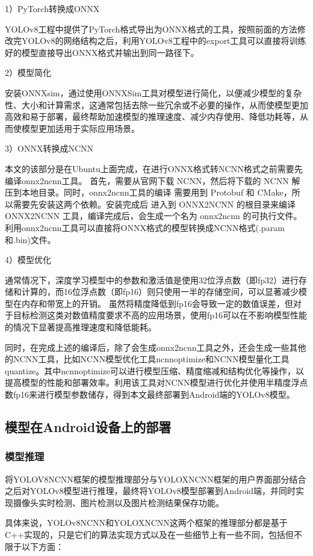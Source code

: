 \documentclass{ctexart}
\numberwithin{equation}{section}%
\numberwithin{figure}{section}%
\numberwithin{table}{section}%
\begin{document}
	1）PyTorch转换成ONNX
	
	YOLOv8工程中提供了PyTorch格式导出为ONNX格式的工具，按照前面的方法修改完YOLOv8的网络结构之后，利用YOLOv8工程中的export工具可以直接将训练好的模型直接导出ONNX格式并输出到同一路径下。
	
	2）模型简化
	
	安装ONNXsim，通过使用ONNXSim工具对模型进行简化，以便减少模型的复杂性、大小和计算需求，这通常包括去除一些冗余或不必要的操作，从而使模型更加高效和易于部署，最终帮助加速模型的推理速度、减少内存使用、降低功耗等，从而使模型更加适用于实际应用场景。
	
	3）ONNX转换成NCNN
	
	本文的该部分是在Ubuntu上面完成，在进行ONNX格式转NCNN格式之前需要先编译onnx2ncnn工具。
	首先，需要从官网下载 NCNN，然后将下载的 NCNN 解压到本地目录。同时，onnx2ncnn工具的编译 需要用到 Protobuf 和 CMake，所以需要先安装这两个依赖。安装完成后
	进入到 ONNX2NCNN 的根目录来编译 ONNX2NCNN 工具，编译完成后，会生成一个名为 onnx2ncnn 的可执行文件。利用onnx2ncnn工具可以直接将ONNX格式的模型转换成NCNN格式(.param和.bin)文件。
	
	4）模型优化

	通常情况下，深度学习模型中的参数和激活值是使用32位浮点数（即fp32）进行存储和计算的，而16位浮点数（即fp16）则只使用一半的存储空间，可以显著减少模型在内存和带宽上的开销。
	虽然将精度降低到fp16会导致一定的数值误差，但对于目标检测这类对数值精度要求不高的应用场景，使用fp16可以在不影响模型性能的情况下显著提高推理速度和降低能耗。
	
	同时，在完成上述的编译后，除了会生成onnx2ncnn工具之外，还会生成一些其他的NCNN工具，比如NCNN模型优化工具ncnnoptimize和NCNN模型量化工具quantize。其中ncnnoptimize可以进行模型压缩、精度缩减和结构优化等操作，以提高模型的性能和部署效率。利用该工具对NCNN模型进行优化并使用半精度浮点数fp16来进行模型参数储存，得到本文最终部署到Android端的YOLOv8模型。
	
	\subsection{模型在Android设备上的部署}
	\subsubsection{模型推理}
	将YOLOV8NCNN框架的模型推理部分与YOLOXNCNN框架的用户界面部分结合之后对YOLOv8模型进行推理，最终将YOLOv8模型部署到Android端，并同时实现摄像头实时检测、图片检测以及图片检测结果保存功能。
	
	具体来说，YOLOv8NCNN和YOLOXNCNN这两个框架的推理部分都是基于C++实现的，只是它们的算法实现方式以及在一些细节上有一些不同，包括但不限于以下方面：
	
\end{document}
